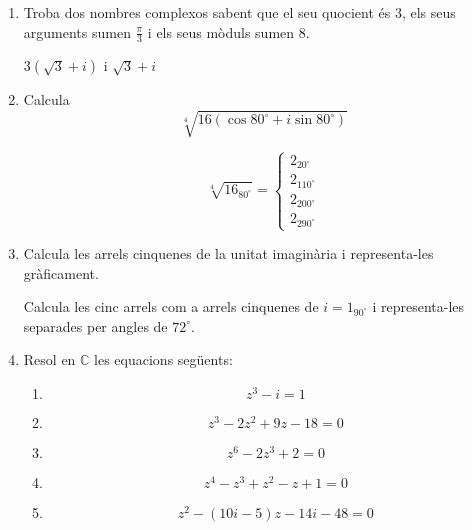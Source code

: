 \begin{enumerate}
\begin{indicacio}
(a) $x=-30
^{\circ}
+k\cdot 360
^{\circ}
$; (b) $x=150
^{\circ}
+k\cdot 360
^{\circ}
$; (c) $x=60
^{\circ}
+k\cdot 360
^{\circ}
$; (d) $x=-60
^{\circ}
+k\cdot 360
^{\circ}
$, sent $k\in \mathbb{Z}$
\end{indicacio}

\item Troba dos nombres complexos sabent que el seu quocient és $3$, els seus arguments sumen $\frac{\pi }{3}$ i els seus mòduls sumen $8$.

\begin{indicacio}
$3(\sqrt{3}+i)$ i $\sqrt{3}+i$
\end{indicacio}

\item Calcula
\[
\sqrt[4]{16\left( \cos 80
^{\circ}
+i\sin 80
^{\circ}
\right) }
\]

\begin{indicacio}
\[
\sqrt[4]{16_{80
^{\circ}
}}=\left\{
\begin{array}{l}
2_{20
^{\circ}
} \\
2_{110
^{\circ}
} \\
2_{200
^{\circ}
} \\
2_{290
^{\circ}
}
\end{array}
\right.
\]
\end{indicacio}

\item Calcula les arrels cinquenes de la unitat imaginària i representa-les gràficament.

\begin{indicacio}Calcula les cinc arrels com a arrels cinquenes de $i=1_{90^{\circ}}$ i representa-les separades per angles de $72^{\circ}$.\end{indicacio}

\item Resol en $\mathbb{C}$ les equacions següents:

\begin{enumerate}
\item[a)]
\[
z^{3}-i=1
\]

\item[b)]
\[
z^{3}-2z^{2}+9z-18=0
\]

\item[c)]
\[
z^{6}-2z^{3}+2=0
\]

\item[d)]
\[
z^{4}-z^{3}+z^{2}-z+1=0
\]

\item[e)]
\[
z^{2}-(10i-5)z-14i-48=0
\]
\end{enumerate}


\end{enumerate}
